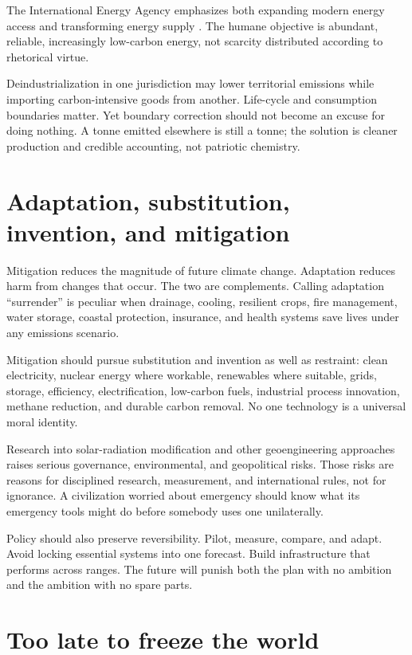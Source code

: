 \documentclass[12pt,a4paper]{book}
\begin{document}
The International Energy Agency emphasizes both expanding modern energy access
and transforming energy supply \cite{IEA2024Africa,IEAAccessAffordability}.
The humane objective is abundant, reliable, increasingly low-carbon energy,
not scarcity distributed according to rhetorical virtue.

Deindustrialization in one jurisdiction may lower territorial emissions while
importing carbon-intensive goods from another.  Life-cycle and consumption
boundaries matter.  Yet boundary correction should not become an excuse for
doing nothing.  A tonne emitted elsewhere is still a tonne; the solution is
cleaner production and credible accounting, not patriotic chemistry.

\section{Adaptation, substitution, invention, and mitigation}

Mitigation reduces the magnitude of future climate change.  Adaptation reduces
harm from changes that occur.  The two are complements.  Calling adaptation
``surrender'' is peculiar when drainage, cooling, resilient crops, fire
management, water storage, coastal protection, insurance, and health systems
save lives under any emissions scenario.

Mitigation should pursue substitution and invention as well as restraint:
clean electricity, nuclear energy where workable, renewables where suitable,
grids, storage, efficiency, electrification, low-carbon fuels, industrial
process innovation, methane reduction, and durable carbon removal.  No one
technology is a universal moral identity.

Research into solar-radiation modification and other geoengineering approaches
raises serious governance, environmental, and geopolitical risks.  Those risks
are reasons for disciplined research, measurement, and international rules,
not for ignorance.  A civilization worried about emergency should know what
its emergency tools might do before somebody uses one unilaterally.

Policy should also preserve reversibility.  Pilot, measure, compare, and adapt.
Avoid locking essential systems into one forecast.  Build infrastructure that
performs across ranges.  The future will punish both the plan with no ambition
and the ambition with no spare parts.

\section{Too late to freeze the world}
\end{document}
